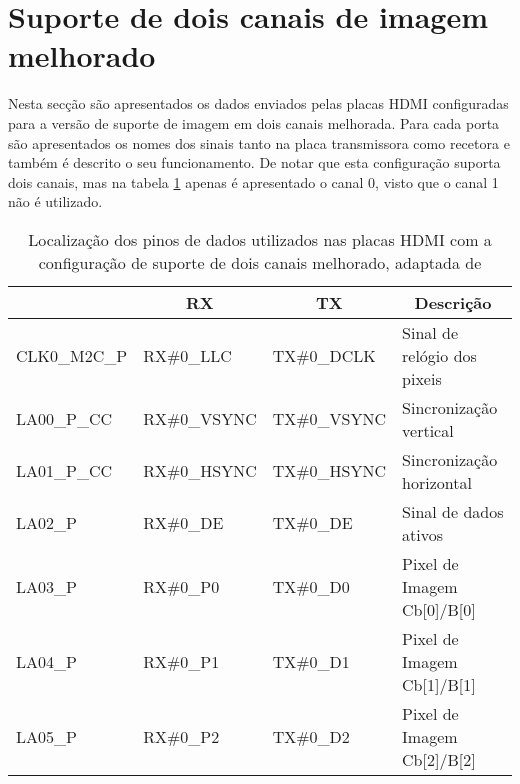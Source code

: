\section{Suporte de dois canais de imagem melhorado} \label{ap1:HDMIconfigMelhorado}

Nesta secção são apresentados os dados enviados pelas placas HDMI configuradas para a versão de suporte de imagem em dois canais melhorada. Para cada porta são apresentados os nomes dos sinais tanto na placa transmissora como recetora e também é descrito o seu funcionamento. De notar que esta configuração suporta dois canais, mas na tabela \ref{table:HDMI1canal_melhorado} apenas é apresentado o canal 0, visto que o canal 1 não é utilizado.
\\


\begin{longtable}[h!]
	{@{}llll@{}}
	\caption[Localização dos pinos de dados utilizados nas placas HDMI com a configuração de suporte de dois canais melhorado]{Localização dos pinos de dados utilizados nas placas HDMI com a configuração de suporte de dois canais melhorado, adaptada de \cite{R013}}
	\label{table:HDMI1canal_melhorado}
	\hline
	\centering
	\multicolumn{1}{c}{\textbf{PORTA}} & \multicolumn{1}{c}{\textbf{RX}} & \multicolumn{1}{c}{\textbf{TX}} & \multicolumn{1}{c}{\textbf{Descrição}} \\ \hline \endhead
	CLK0\_M2C\_P & RX\#0\_LLC          				& TX\#0\_DCLK                          & Sinal de relógio dos pixeis 			\\ 
	LA00\_P\_CC  & RX\#0\_VSYNC         			  & TX\#0\_VSYNC                         & Sincronização vertical         		\\ 
	LA01\_P\_CC  & RX\#0\_HSYNC         		  & TX\#0\_HSYNC                         & Sincronização horizontal       		\\ 
	LA02\_P      & RX\#0\_DE            				   & TX\#0\_DE                            & Sinal de dados ativos          		\\
	LA03\_P      & RX\#0\_P0            				   & TX\#0\_D0                            & Pixel de Imagem Cb{[}0{]}/B{[}0{]}   \\
	LA04\_P      & RX\#0\_P1            		      & TX\#0\_D1                            & Pixel de Imagem Cb{[}1{]}/B{[}1{]}   \\ 
	LA05\_P      & RX\#0\_P2            			      & TX\#0\_D2                            & Pixel de Imagem Cb{[}2{]}/B{[}2{]}   \\ 

\end{longtable}
